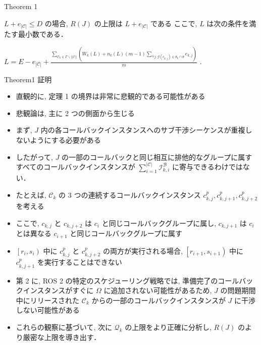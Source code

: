 \begin{frame}{Theorem 1}
    \begin{theorem}[]
        $L+e_{|\mathcal{C}|} \leq D$ の場合, $R(J)$ の上限は $L+e_{|\mathcal{C}|}$ である
        ここで, $L$ は次の条件を満たす最小数である．

        $L=E-e_{|\mathcal{C}|}+\frac{\sum_{\mathcal{C}_{k} \in \Gamma \backslash\{\mathcal{C}\}}\left(W_{k}(L)+n_{k}(L)(m-1) \sum_{\forall j: \mathcal{G}\left(c_{k, j}\right) \in \theta_{k} \cap \theta} e_{k, j}\right)}{m}$ .
    \end{theorem}
\end{frame}

\begin{frame}{Theorem1 証明}
    \todo{}
\end{frame}

\begin{frame}{}
    \begin{itemize}
        \item 直観的に, 定理 1 の境界は非常に悲観的である可能性がある
        \item 悲観論は, 主に 2 つの側面から生じる
        \item まず, $J$ 内の各コールバックインスタンスへのサブ干渉シーケンスが重複しないようにする必要がある
        \item したがって, $J$ の一部のコールバックと同じ相互に排他的なグループに属すすべてのコールバックインスタンスが $\sum_{i=1}^{|\mathcal{C}|} \mathcal{I}_{k, i}^{\mathcal{B}}$ に寄与できるわけではない．
    \end{itemize}
\end{frame}

\begin{frame}{}
    \begin{itemize}
        \item たとえば, $\mathcal{C}_{k}$ の 3 つの連続するコールバックインスタンス $c_{k, j}^{p}, c_{k, j+1}^{p}, c_{k, j+2}^{p}$ を考える
        \item ここで, $c_{k, j}$ と $c_{k, j+2}$ は $c_{i}$ と同じコールバックグループに属し, $c_{k, j+1}$ は $c_{i}$ とは異なる $c_{i+1}$ と同じコールバックグループに属す
        \item $\left[r_{i}, s_{i}\right)$ 中に $c_{k, j}^{p}$ と $c_{k, j+2}^{p}$ の両方が実行される場合, $\left[r_{i+1}, s_{i+1}\right)$ 中に $c_{k, j+1}^{p}$ を実行することはできない
    \end{itemize}
\end{frame}

\begin{frame}{}
    \begin{itemize}
        \item 第 2 に, ROS 2 の特定のスケジューリング戦略では, 準備完了のコールバックインスタンスがすぐに $\Omega$ に追加されない可能性があるため, $J$ の問題期間中にリリースされた $\mathcal{C}_{k}$ からの一部のコールバックインスタンスが $J$ に干渉しない可能性がある
        \item これらの観察に基づいて, 次に $\mathcal{Q}_{k}$ の上限をより正確に分析し, $R(J)$ のより厳密な上限を導き出す．
    \end{itemize}
\end{frame}
